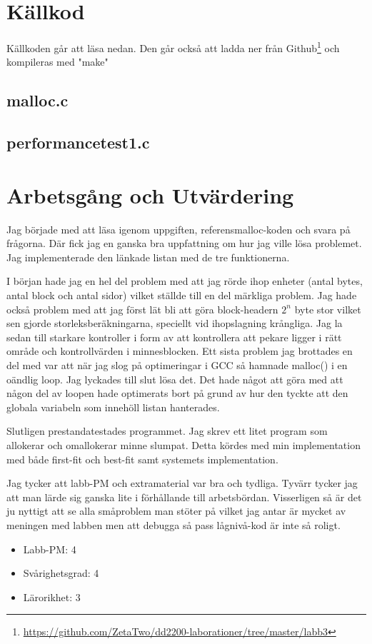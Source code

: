 \documentclass[10pt,a4paper]{article}
\begin{document}
\clearpage
\section{Källkod}
Källkoden går att läsa nedan. Den går också att ladda ner från Github\footnote{\url{https://github.com/ZetaTwo/dd2200-laborationer/tree/master/labb3}} och kompileras med "make"

\subsection{malloc.c}

\clearpage

\subsection{performancetest1.c}

\clearpage

\section{Arbetsgång och Utvärdering}

Jag började med att läsa igenom uppgiften, referensmalloc-koden och svara på frågorna. Där fick jag en ganska bra uppfattning om hur jag ville lösa problemet. Jag implementerade den länkade listan med de tre funktionerna.

I början hade jag en hel del problem med att jag rörde ihop enheter (antal bytes, antal block och antal sidor) vilket ställde till en del märkliga problem. Jag hade också problem med att jag först lät bli att göra block-headern $2^n$ byte stor vilket sen gjorde storleksberäkningarna, speciellt vid ihopslagning krångliga. Jag la sedan till starkare kontroller i form av att kontrollera att pekare ligger i rätt område och kontrollvärden i minnesblocken. Ett sista problem jag brottades en del med var att när jag slog på optimeringar i GCC så hamnade malloc() i en oändlig loop. Jag lyckades till slut lösa det. Det hade något att göra med att någon del av loopen hade optimerats bort på grund av hur den tyckte att den globala variabeln som innehöll listan hanterades.

Slutligen prestandatestades programmet. Jag skrev ett litet program som allokerar och omallokerar minne slumpat. Detta kördes med min implementation med både first-fit och best-fit samt systemets implementation.

Jag tycker att labb-PM och extramaterial var bra och tydliga. Tyvärr tycker jag att man lärde sig ganska lite i förhållande till arbetsbördan. Visserligen så är det ju nyttigt att se alla småproblem man stöter på vilket jag antar är mycket av meningen med labben men att debugga så pass lågnivå-kod är inte så roligt.

\begin{itemize}
\item Labb-PM: 4
\item Svårighetsgrad: 4
\item Lärorikhet: 3
\end{itemize}
\end{document}
